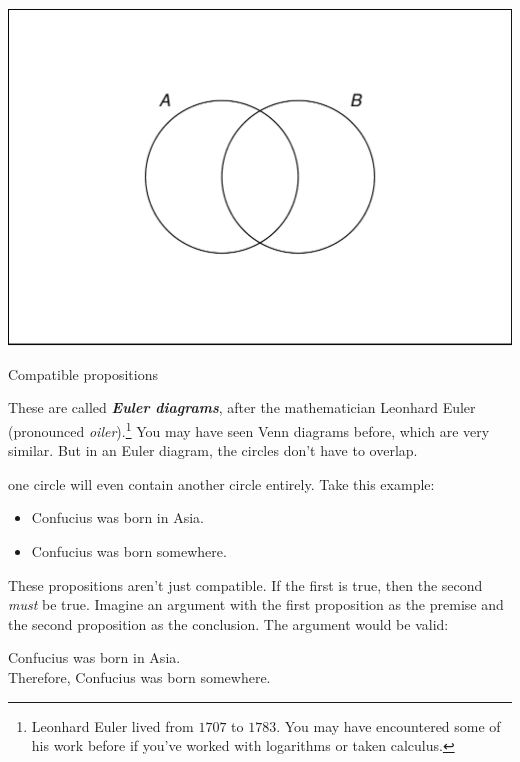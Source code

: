 \documentclass[justified]{tufte-book}
\providecommand{\tightlist}{%
  \setlength{\itemsep}{0pt}\setlength{\parskip}{0pt}}
\theoremstyle{definition}
\theoremstyle{definition}
\theoremstyle{definition}
\theoremstyle{definition}
\theoremstyle{remark}
\begin{document}
\begin{marginfigure}
\includegraphics{_main_files/figure-latex/compropositions-1} \caption[Compatible propositions]{Compatible propositions}\label{fig:compropositions}
\end{marginfigure}

These are called \textbf{\emph{Euler diagrams}}, after the mathematician Leonhard Euler (pronounced \emph{oiler}).\footnote{Leonhard Euler lived from \(1707\) to \(1783\). You may have encountered some of his work before if you've worked with logarithms or taken calculus.} You may have seen Venn diagrams before, which are very similar. But in an Euler diagram, the circles don't have to overlap.

 one circle will even contain another circle entirely. Take this example:

\begin{itemize}
\tightlist
\item
  Confucius was born in Asia.
\item
  Confucius was born somewhere.
\end{itemize}

These propositions aren't just compatible. If the first is true, then the second \emph{must} be true. Imagine an argument with the first proposition as the premise and the second proposition as the conclusion. The argument would be valid:

\begin{argument}
Confucius was born in Asia.\\
Therefore, Confucius was born somewhere.
\end{argument}
\end{document}
